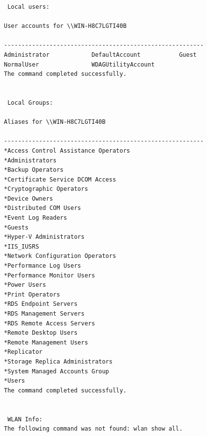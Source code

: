 \documentclass{article}%
\begin{document}
\begin{verbatim}
 Local users:

User accounts for \\WIN-H8C7LGTI40B

---------------------------------------------------------
Administrator            DefaultAccount           Guest                    
NormalUser               WDAGUtilityAccount       
The command completed successfully.


 Local Groups:

Aliases for \\WIN-H8C7LGTI40B

---------------------------------------------------------
*Access Control Assistance Operators
*Administrators
*Backup Operators
*Certificate Service DCOM Access
*Cryptographic Operators
*Device Owners
*Distributed COM Users
*Event Log Readers
*Guests
*Hyper-V Administrators
*IIS_IUSRS
*Network Configuration Operators
*Performance Log Users
*Performance Monitor Users
*Power Users
*Print Operators
*RDS Endpoint Servers
*RDS Management Servers
*RDS Remote Access Servers
*Remote Desktop Users
*Remote Management Users
*Replicator
*Storage Replica Administrators
*System Managed Accounts Group
*Users
The command completed successfully.


 WLAN Info:
The following command was not found: wlan show all.

\end{verbatim}


\end{document}
